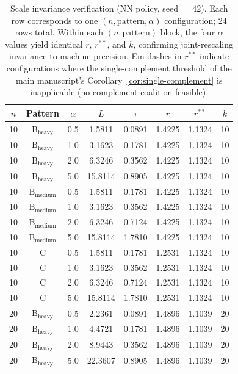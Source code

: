 \documentclass[11pt]{article}
\theoremstyle{plain}
\theoremstyle{definition}
\theoremstyle{remark}
\begin{document}
\begin{table}[htbp]
\centering
\footnotesize
\caption{Scale invariance verification (NN policy, seed $=42$). Each row corresponds to one $(n,\text{pattern},\alpha)$ configuration; 24 rows total. Within each $(n,\text{pattern})$ block, the four $\alpha$ values yield identical $r$, $r^{\ast\ast}$, and $k$, confirming joint-rescaling invariance to machine precision. Em-dashes in $r^{\ast\ast}$ indicate configurations where the single-complement threshold of the main manuscript's Corollary~\ref{cor:single-complement} is inapplicable (no complement coalition feasible).}
\label{tab:scale-invariance}
\begin{tabular}{@{}cccccccc@{}}
\toprule
$n$ & Pattern & $\alpha$ & $L$ & $\tau$ & $r$ & $r^{\ast\ast}$ & $k$ \\
\midrule
10 & $\text{B}_{\text{heavy}}$ & 0.5 & 1.5811 & 0.0891 & 1.4225 & 1.1324 & 10 \\
10 & $\text{B}_{\text{heavy}}$ & 1.0 & 3.1623 & 0.1781 & 1.4225 & 1.1324 & 10 \\
10 & $\text{B}_{\text{heavy}}$ & 2.0 & 6.3246 & 0.3562 & 1.4225 & 1.1324 & 10 \\
10 & $\text{B}_{\text{heavy}}$ & 5.0 & 15.8114 & 0.8905 & 1.4225 & 1.1324 & 10 \\
\midrule
10 & $\text{B}_{\text{medium}}$ & 0.5 & 1.5811 & 0.1781 & 1.4225 & 1.1324 & 10 \\
10 & $\text{B}_{\text{medium}}$ & 1.0 & 3.1623 & 0.3562 & 1.4225 & 1.1324 & 10 \\
10 & $\text{B}_{\text{medium}}$ & 2.0 & 6.3246 & 0.7124 & 1.4225 & 1.1324 & 10 \\
10 & $\text{B}_{\text{medium}}$ & 5.0 & 15.8114 & 1.7810 & 1.4225 & 1.1324 & 10 \\
\midrule
10 & C & 0.5 & 1.5811 & 0.1781 & 1.2531 & 1.1324 & 10 \\
10 & C & 1.0 & 3.1623 & 0.3562 & 1.2531 & 1.1324 & 10 \\
10 & C & 2.0 & 6.3246 & 0.7124 & 1.2531 & 1.1324 & 10 \\
10 & C & 5.0 & 15.8114 & 1.7810 & 1.2531 & 1.1324 & 10 \\
\midrule
20 & $\text{B}_{\text{heavy}}$ & 0.5 & 2.2361 & 0.0891 & 1.4896 & 1.1039 & 20 \\
20 & $\text{B}_{\text{heavy}}$ & 1.0 & 4.4721 & 0.1781 & 1.4896 & 1.1039 & 20 \\
20 & $\text{B}_{\text{heavy}}$ & 2.0 & 8.9443 & 0.3562 & 1.4896 & 1.1039 & 20 \\
20 & $\text{B}_{\text{heavy}}$ & 5.0 & 22.3607 & 0.8905 & 1.4896 & 1.1039 & 20 \\

\end{tabular}
\end{table}
\end{document}

